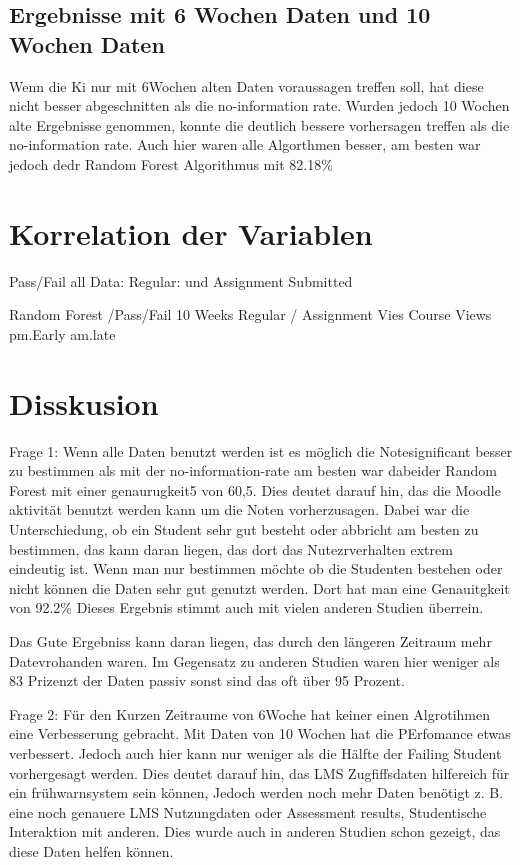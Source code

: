 \subsection{Ergebnisse mit 6 Wochen Daten und 10 Wochen Daten}
Wenn die Ki nur mit 6Wochen alten Daten voraussagen treffen soll,
hat diese nicht besser abgeschnitten als die no-information rate.
Wurden jedoch 10 Wochen alte Ergebnisse genommen, konnte die deutlich bessere
vorhersagen treffen als die no-information rate. Auch hier waren alle Algorthmen besser,
am besten war jedoch dedr Random Forest Algorithmus mit 82.18\%

\section{Korrelation der Variablen}

Pass/Fail all Data:
Regular: und Assignment Submitted


Random Forest /Pass/Fail 10 Weeks
Regular / Assignment Vies
Course Views
pm.Early
am.late


\section{Disskusion}
Frage 1: Wenn alle Daten benutzt werden ist es möglich die Notesignificant besser zu bestimmen als mit der no-information-rate 
am besten war dabeider Random Forest mit einer genaurugkeit5 von 60,5. Dies deutet darauf hin, das die Moodle aktivität benutzt werden kann um die Noten vorherzusagen.
Dabei war die Unterschiedung, ob ein Student sehr gut besteht oder abbricht am besten zu bestimmen, das kann daran liegen, das dort das Nutezrverhalten extrem eindeutig ist.
Wenn man nur bestimmen möchte ob die Studenten bestehen oder nicht können die Daten sehr gut genutzt werden. Dort hat man eine Genauitgkeit von 92.2\%
Dieses Ergebnis stimmt auch mit vielen anderen Studien überrein.

Das Gute Ergebniss kann daran liegen, das durch den längeren Zeitraum mehr Datevrohanden waren. Im Gegensatz zu anderen Studien waren hier weniger als 83 Prizenzt der Daten passiv sonst sind das oft über 95 Prozent.



Frage 2: Für den Kurzen Zeitraume von 6Woche  hat keiner einen Algrotihmen eine Verbesserung gebracht. Mit Daten von 10 Wochen hat die PErfomance etwas verbessert.
Jedoch auch hier kann nur weniger als die Hälfte der Failing Student vorhergesagt werden. Dies deutet darauf hin, das LMS Zugfiffsdaten hilfereich für ein frühwarnsystem sein können,
Jedoch werden noch mehr Daten benötigt z. B. eine noch genauere LMS Nutzungdaten oder Assessment results, Studentische Interaktion mit anderen. Dies wurde auch in anderen Studien schon gezeigt, das diese Daten helfen können.

